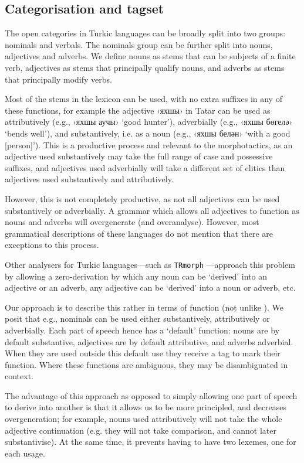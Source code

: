 \documentclass[a4paper,11pt,twocolumn]{article}
\begin{document}
\subsection{Categorisation and tagset}

The open categories in Turkic languages can be broadly split into two groups: nominals
and verbals. The nominals group can be further split into nouns, adjectives and adverbs.
We define nouns as stems that can be subjects of a finite verb, adjectives as stems that principally qualify 
nouns, and adverbs as stems that principally modify verbs.

Most of the stems in the lexicon can be used, with no extra suffixes in any of these functions, for 
example the adjective ‹яхшы› in Tatar can be used as attributively (e.g., ‹яхшы аучы› `good hunter'), adverbially
(e.g., ‹яхшы бөгелә› `bends well'), and substantively, i.e. as a noun (e.g., ‹яхшы белән› `with a good [person]’). This
is a productive process and relevant to the morphotactics, as an adjective used substantively may take the 
full range of case and possessive suffixes, and adjectives used adverbially will take a different set of 
clitics than adjectives used substantively and attributively. 

However, this is not completely productive, as not all adjectives can be used substantively or adverbially. A grammar which allows all adjectives to function
as nouns and adverbs will overgenerate (and overanalyse). However, most grammatical descriptions of these languages do not 
mention that there are exceptions to this process.

Other analysers for Turkic languages---such as \texttt{TRmorph} \citep{coltekin2010}---approach this 
problem by allowing a zero-derivation by which any noun can be `derived' into an adjective or 
an adverb, any adjective can be `derived' into a noun or adverb, etc. 

Our approach is to describe this rather in terms of function (not unlike \cite{hengeveld92}). We 
posit that e.g., nominals can be used either substantively, attributively or adverbially. Each part of speech 
hence has a `default' function: nouns are by default substantive, adjectives are by default attributive, 
and adverbs adverbial. When they are used outside this default use they receive a tag to mark 
their function. Where these functions are ambiguous, they may be disambiguated 
in context. 

The advantage of this approach as opposed to simply allowing one part of speech to derive into
another is that it allows us to be more principled, and decreases overgeneration;
for example, nouns used attributively will not take the whole adjective continuation (e.g.
they will not take comparison, and cannot later substantivise). At the same time, it prevents 
having to have two lexemes, one for each usage.
\end{document}
